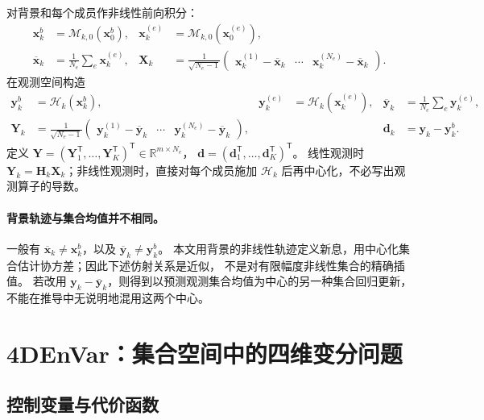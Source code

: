 \documentclass[11pt,a4paper]{article}
\newcommand{\T}{\mathsf T}
\newcommand{\R}{\mathbb R}
\newcommand{\xx}{\mathbf x}
\newcommand{\yy}{\mathbf y}
\newcommand{\dd}{\mathbf d}
\begin{document}
对背景和每个成员作非线性前向积分：
\begin{align}
 \xx_k^b&=\mathcal M_{k,0}(\xx_0^b),&
 \xx_k^{(e)}&=\mathcal M_{k,0}(\xx_0^{(e)}),\\
 \overline{\xx}_k&=\frac1{N_e}\sum_e\xx_k^{(e)},&
 \mathbf X_k&=\frac1{\sqrt{N_e-1}}
 \begin{pmatrix}\xx_k^{(1)}-\overline{\xx}_k&\cdots&
 \xx_k^{(N_e)}-\overline{\xx}_k\end{pmatrix}.
\end{align}
在观测空间构造
\begin{align}
 \mathbf y_k^b&=\mathcal H_k(\xx_k^b),&
 \mathbf y_k^{(e)}&=\mathcal H_k(\xx_k^{(e)}),&
 \overline{\mathbf y}_k&=\frac1{N_e}\sum_e\mathbf y_k^{(e)},\\
 \mathbf Y_k&=\frac1{\sqrt{N_e-1}}
 \begin{pmatrix}\mathbf y_k^{(1)}-\overline{\mathbf y}_k&\cdots&
 \mathbf y_k^{(N_e)}-\overline{\mathbf y}_k\end{pmatrix},&&&
 \dd_k&=\yy_k-\mathbf y_k^b.
 \label{eq:Yk}
\end{align}
定义 $\mathbf Y=(\mathbf Y_1^\T,\ldots,\mathbf Y_K^\T)^\T\in\R^{m\times N_e}$，
$\dd=(\dd_1^\T,\ldots,\dd_K^\T)^\T$。
线性观测时 $\mathbf Y_k=\mathbf H_k\mathbf X_k$；非线性观测时，直接对每个成员施加
$\mathcal H_k$ 后再中心化，不必写出观测算子的导数。

\paragraph{背景轨迹与集合均值并不相同。}
一般有 $\overline{\xx}_k\ne\xx_k^b$，以及
$\overline{\mathbf y}_k\ne\mathbf y_k^b$。
本文用背景的非线性轨迹定义新息，用中心化集合估计协方差；因此下述仿射关系是近似，
不是对有限幅度非线性集合的精确插值。
若改用 $\yy_k-\overline{\mathbf y}_k$，则得到以预测观测集合均值为中心的另一种集合回归更新，
不能在推导中无说明地混用这两个中心。

\section{4DEnVar：集合空间中的四维变分问题}

\subsection{控制变量与代价函数}
\end{document}
